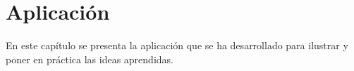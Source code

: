 \cleardoublepage

\chapter{Aplicación}
\label{makereference4}

En este capítulo se presenta la aplicación que se ha desarrollado para ilustrar
y poner en práctica las ideas aprendidas.
